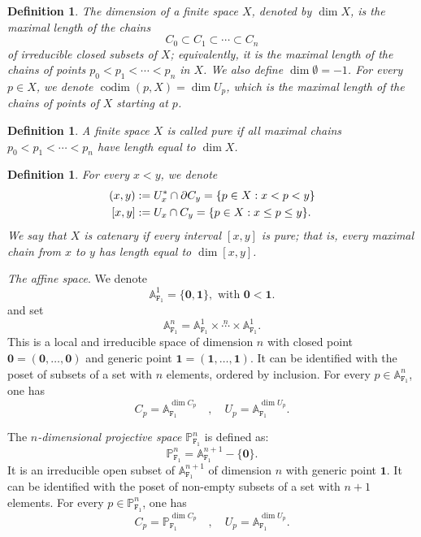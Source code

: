 \documentclass[amssymb,amscd,11pt,20pt]{amsart}
\newcommand{\codim}{{\operatorname{codim}}}
\newcommand{\FF}{{\mathtt F}}
\newcommand{\PP}{\mathbb P}
\newcommand{\0}{\mathbf 0}
\newcommand{\un}{\mathbf 1}
\newcommand{\A}{{\mathbb A}}
\theoremstyle{plain}
\newtheorem{defn}[thm]{Definition}
\numberwithin{equation}{thm}
\begin{document}
\begin{defn}{\rm  The {\em dimension}  of a finite space $X$, denoted by $\dim X$, is the maximal length of the chains  
\[ C_0 \subset C_1\subset \cdots\subset C_n\] of irreducible closed subsets of $X$; equivalently, it is the maximal length of the chains of points $p_0 <p_1 <\cdots < p_n$ in $X$. We  also define $\dim \emptyset=-1$. For every $p\in X$, we denote $\codim(p,X)=\dim U_p$, which is the maximal length of the chains of points of $X$ starting at $p$.} 
\end{defn}

\begin{defn}\label{dimension+pure} {\rm A finite space  $X$ is called {\em pure} if all  maximal chains $p_0 <p_1 <\cdots < p_n$ have length equal to $\dim X$. }\end{defn}

\begin{defn}\label{catenary}{\rm For every $x <y$, we  denote
\[\aligned  (x,y)&:=U_x^*\cap  \partial C_y=\{ p\in X: x<p<y\} 
\\   [x,y]&:= U_x  \cap  C_y =\{ p\in X: x\leq p\leq y\}.\endaligned \] We say that $X$ is {\em catenary} if every interval $[x,y]$ is pure; that is, every maximal chain from $x$ to $y$ has length equal to $\dim [x,y]$. 
}
\end{defn}




\medskip

{\em The affine space}. We  denote $$\A^1_{\FF_1}=\{\0,\un\} , \text{ with }  \0 <\un.$$  and set $$\A^n_{\FF_1}= \A^1_{\FF_1}\times\overset n\cdots\times \A^1_{\FF_1}.$$ This is a local and irreducible space of dimension $n$ with closed point $\0=(\0,\dots,\0)$ and generic point $\un=(\un,\dots,\un)$. It can be identified with the poset of subsets of a set with $n$ elements, ordered by inclusion. For every $p\in\A^n_{\FF_1}$, one has
\[ C_p=\A^{\dim C_p}_{\FF_1}\quad ,\quad U_p=\A^{\dim U_p}_{\FF_1}.\]
\medskip

The {\em $n$-dimensional projective space} $\PP^n_{\FF_1}$ is defined as:
\[ \PP^n_{\FF_1}=\A^{n+1}_{\FF_1}-\{\0\}.
\] It is an irreducible open subset of $\A^{n+1}_{\FF_1}$ of dimension $n$ with generic point $\un$.  It can be identified with the poset of non-empty subsets of a set with $n+1$ elements. For every $p\in\PP^n_{\FF_1}$, one has
\[ C_p=\PP^{\dim C_p}_{\FF_1}\quad ,\quad U_p=\A^{\dim U_p}_{\FF_1}.\]
\end{document}
